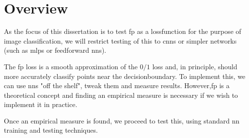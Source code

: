 \section{Overview}

As the focus of this dissertation is to test \gls{fp} as a \gls{lossfunction} for the purpose of image classification, we will restrict testing of this to \gls{cnn}s or simpler networks (such as \gls{mlp}s or \gls{feedforward} \gls{nn}s). 
\bigskip

 The \gls{fp} loss is a smooth approximation of the $0/1$ loss and, in principle, should more accurately classify points near the \gls{decisionboundary}. To implement this, we can use  \gls{nn}s "off the shelf", tweak them and measure results. However,\gls{fp} is a theoretical concept and finding an empirical measure is necessary if we wish to implement it in practice. 
 \bigskip

Once an empirical measure is found, we proceed to test this, using standard \gls{nn} training and testing techniques.
\bigskip


